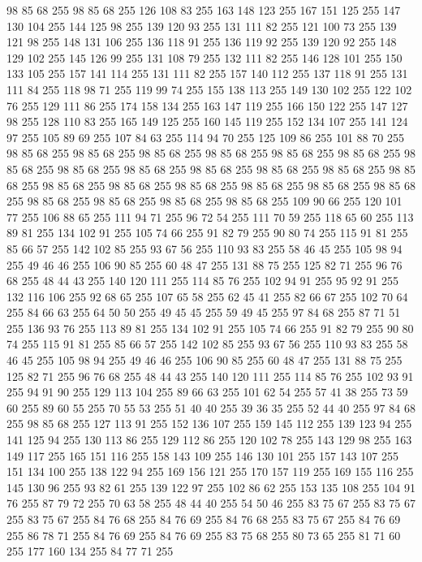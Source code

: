 98 85 68 255 98 85 68 255 126 108 83 255 163 148 123 255 167 151 125 255 147 130 104 255 144 125 98 255 139 120 93 255 131 111 82 255 121 100 73 255 139 121 98 255 148 131 106 255 136 118 91 255 136 119 92 255 139 120 92 255 148 129 102 255 145 126 99 255 131 108 79 255 132 111 82 255 146 128 101 255 150 133 105 255 157 141 114 255 131 111 82 255 157 140 112 255 137 118 91 255 131 111 84 255 118 98 71 255 119 99 74 255 155 138 113 255 149 130 102 255 122 102 76 255 129 111 86 255 174 158 134 255 163 147 119 255 166 150 122 255 147 127 98 255 128 110 83 255 165 149 125 255 160 145 119 255 152 134 107 255 141 124 97 255 105 89 69 255 107 84 63 255 114 94 70 255 125 109 86 255 101 88 70 255 98 85 68 255 98 85 68 255 98 85 68 255 98 85 68 255 98 85 68 255 98 85 68 255 98 85 68 255 98 85 68 255 98 85 68 255 98 85 68 255 98 85 68 255 98 85 68 255 98 85 68 255 98 85 68 255 98 85 68 255 98 85 68 255 98 85 68 255 98 85 68 255
98 85 68 255 98 85 68 255 98 85 68 255 98 85 68 255 98 85 68 255 109 90 66 255 120 101 77 255 106 88 65 255 111 94 71 255 96 72 54 255 111 70 59 255 118 65 60 255 113 89 81 255 134 102 91 255 105 74 66 255 91 82 79 255 90 80 74 255 115 91 81 255 85 66 57 255 142 102 85 255 93 67 56 255 110 93 83 255 58 46 45 255 105 98 94 255 49 46 46 255 106 90 85 255 60 48 47 255 131 88 75 255 125 82 71 255 96 76 68 255 48 44 43 255 140 120 111 255 114 85 76 255 102 94 91 255 95 92 91 255 132 116 106 255 92 68 65 255 107 65 58 255 62 45 41 255 82 66 67 255 102 70 64 255 84 66 63 255 64 50 50 255 49 45 45 255 59 49 45 255 97 84 68 255 87 71 51 255 136 93 76 255 113 89 81 255 134 102 91 255 105 74 66 255 91 82 79 255 90 80 74 255 115 91 81 255 85 66 57 255 142 102 85 255 93 67 56 255 110 93 83 255 58 46 45 255 105 98 94 255 49 46 46 255 106 90 85 255 60 48 47 255 131 88 75 255
125 82 71 255 96 76 68 255 48 44 43 255 140 120 111 255 114 85 76 255 102 93 91 255 94 91 90 255 129 113 104 255 89 66 63 255 101 62 54 255 57 41 38 255 73 59 60 255 89 60 55 255 70 55 53 255 51 40 40 255 39 36 35 255 52 44 40 255 97 84 68 255 98 85 68 255 127 113 91 255 152 136 107 255 159 145 112 255 139 123 94 255 141 125 94 255 130 113 86 255 129 112 86 255 120 102 78 255 143 129 98 255 163 149 117 255 165 151 116 255 158 143 109 255 146 130 101 255 157 143 107 255 151 134 100 255 138 122 94 255 169 156 121 255 170 157 119 255 169 155 116 255 145 130 96 255 93 82 61 255 139 122 97 255 102 86 62 255 153 135 108 255 104 91 76 255 87 79 72 255 70 63 58 255 48 44 40 255 54 50 46 255 83 75 67 255 83 75 67 255 83 75 67 255 84 76 68 255 84 76 69 255 84 76 68 255 83 75 67 255 84 76 69 255 86 78 71 255 84 76 69 255 84 76 69 255 83 75 68 255 80 73 65 255 81 71 60 255 177 160 134 255 84 77 71 255
